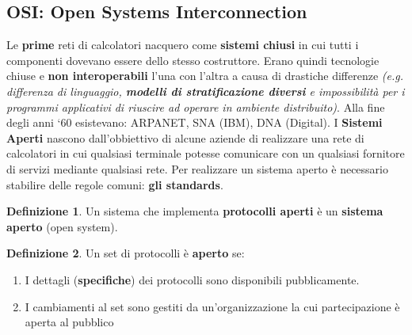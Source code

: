 \documentclass[11pt,a4paper]{article}
\theoremstyle{definition}
\newtheorem{definition}{Definizione}[section]
\begin{document}
\subsection{OSI: Open Systems Interconnection}
Le \textbf{prime} reti di calcolatori nacquero come \textbf{sistemi chiusi} in cui tutti i componenti dovevano essere dello stesso costruttore. Erano quindi tecnologie chiuse e \textbf{non interoperabili} l'una con l'altra a causa di drastiche differenze \textit{(e.g. differenza di linguaggio, \textbf{modelli di stratificazione diversi} e impossibilità per i programmi applicativi di riuscire ad operare in ambiente distribuito)}. Alla fine degli anni ‘60 esistevano: ARPANET, SNA (IBM), DNA (Digital).\newline
I \textbf{Sistemi Aperti} nascono dall'obbiettivo di alcune aziende di realizzare una rete di calcolatori in cui qualsiasi terminale potesse comunicare con un qualsiasi fornitore di servizi mediante qualsiasi rete.\newline\newline
Per realizzare un sistema aperto è necessario stabilire delle regole comuni: \textbf{gli standards}.
\theoremstyle{definition}
\begin{definition}
	Un sistema che implementa \textbf{protocolli aperti} è un \textbf{sistema aperto} (open system).
\end{definition}
\begin{definition}
	Un set di protocolli è \textbf{aperto} se:
	\begin{enumerate}
		\item I dettagli (\textbf{specifiche}) dei protocolli sono disponibili pubblicamente.
		\item I cambiamenti al set sono gestiti da un’organizzazione la cui
		      partecipazione è aperta al pubblico
	\end{enumerate}
\end{definition}
\end{document}
